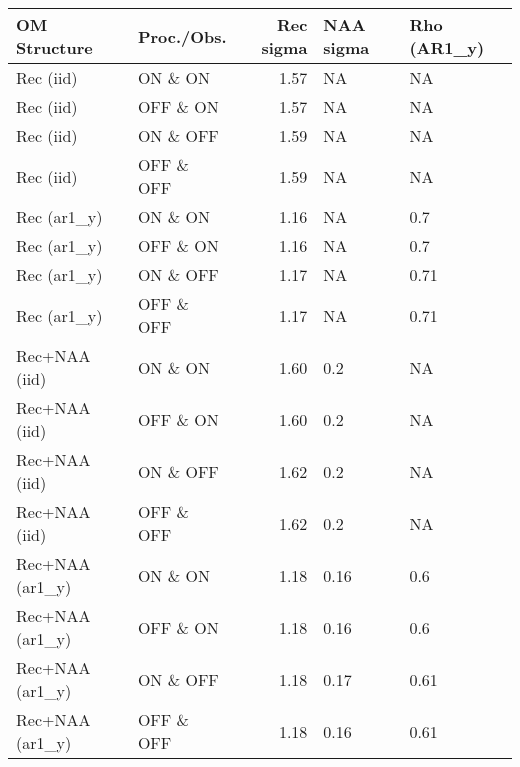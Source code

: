 \begin{table}[H]
    \centering
    \begin{tabular}{llrll}
        \toprule
         OM Structure & Proc./Obs. & Rec sigma & NAA sigma & Rho (AR1\_y) \\
        \midrule
        Rec (iid)       & ON \& ON   & 1.57 & NA & NA \\
        Rec (iid)       & OFF \& ON  & 1.57 & NA & NA \\
        Rec (iid)       & ON \& OFF  & 1.59 & NA & NA \\
        Rec (iid)       & OFF \& OFF & 1.59 & NA & NA \\
        Rec (ar1\_y)    & ON \& ON   & 1.16 & NA & 0.7 \\
        Rec (ar1\_y)    & OFF \& ON  & 1.16 & NA & 0.7 \\
        Rec (ar1\_y)    & ON \& OFF  & 1.17 & NA & 0.71 \\
        Rec (ar1\_y)    & OFF \& OFF & 1.17 & NA & 0.71 \\
        Rec+NAA (iid)     & ON \& ON   & 1.60 & 0.2 & NA \\
        Rec+NAA (iid)     & OFF \& ON  & 1.60 & 0.2 & NA \\
        Rec+NAA (iid)     & ON \& OFF  & 1.62 & 0.2 & NA \\
        Rec+NAA (iid)     & OFF \& OFF & 1.62 & 0.2 & NA \\
        Rec+NAA (ar1\_y)  & ON \& ON   & 1.18 & 0.16 & 0.6 \\
        Rec+NAA (ar1\_y)  & OFF \& ON  & 1.18 & 0.16 & 0.6 \\
        Rec+NAA (ar1\_y)  & ON \& OFF  & 1.18 & 0.17 & 0.61 \\
        Rec+NAA (ar1\_y)  & OFF \& OFF & 1.18 & 0.16 & 0.61 \\
        \bottomrule
    \end{tabular}
\end{table}
